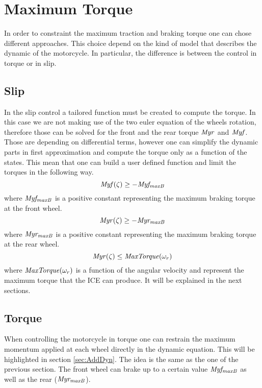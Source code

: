 \section{Maximum Torque}
%
% 
In order to constraint the maximum traction and braking torque one can chose different approaches. This choice depend on the kind of model that describes the dynamic of the motorcycle. In particular, the difference is between the control in torque or in slip.
%
\subsection{Slip}
%
In the slip control a tailored function must be created to compute the torque. In this case we are not making use of the two euler equation of the wheels rotation, therefore those can be solved for the front and the rear torque $\it Myr$ and $\it Myf$. Those are depending on differential terms, however one can simplify the dynamic parts in first approximation and compute the torque only as a function of the states. This mean that one can build a user defined function and limit the torques in the following way.
%
\begin{equation}
    {\it Myf}(\zeta) \ge -{\it Myf_{maxB}}
\end{equation}
%
where ${\it Myf_{maxB}}$ is a positive constant representing the maximum braking torque at the front wheel.
%
\begin{equation}
    {\it Myr}(\zeta) \ge -{\it Myr_{maxB}}
\end{equation}
%
where ${\it Myr_{maxB}}$ is a positive constant representing the maximum braking torque at the rear wheel.
%
\begin{equation}
    {\it Myr}(\zeta) \le {\it MaxTorque}(\omega_r)
\end{equation}
%
where ${\it MaxTorque}(\omega_r)$ is a function of the angular velocity and represent the maximum torque that the ICE can produce. It will be explained in the next sections.
%
\subsection{Torque}
%
When controlling the motorcycle in torque one can restrain the maximum momentum applied at each wheel directly in the dynamic equation. This will be highlighted in section \ref{sec:AddDyn}. The idea is the same as the one of the previous section. The front wheel can brake up to a certain value ${\it Myf_{maxB}}$ as well as the rear (${\it Myr_{maxB}}$).
%
